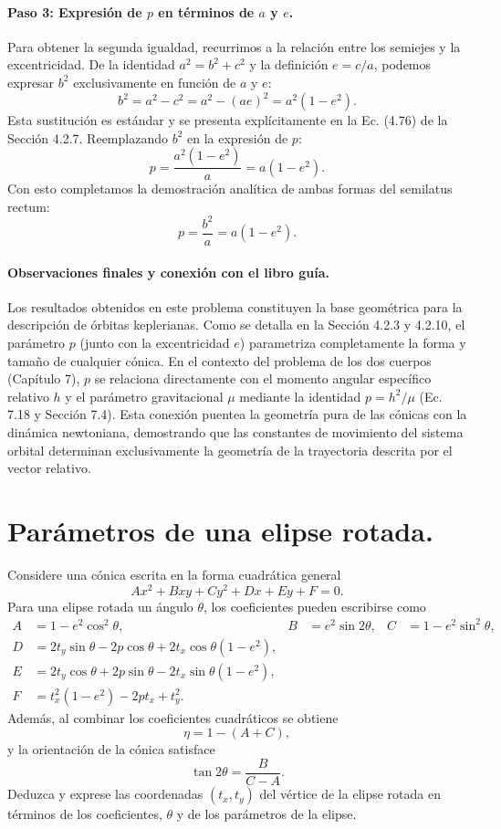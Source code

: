\documentclass[12pt, a4paper]{article}
\begin{document}
\paragraph{Paso 3: Expresión de $p$ en términos de $a$ y $e$.}
Para obtener la segunda igualdad, recurrimos a la relación entre los semiejes y la excentricidad. De la identidad $a^2 = b^2 + c^2$ y la definición $e = c/a$, podemos expresar $b^2$ exclusivamente en función de $a$ y $e$:
$$
b^2 = a^2 - c^2 = a^2 - (ae)^2 = a^2(1 - e^2).
$$
Esta sustitución es estándar y se presenta explícitamente en la Ec. (4.76) de la Sección 4.2.7. Reemplazando $b^2$ en la expresión de $p$:
$$
p = \frac{a^2(1 - e^2)}{a} = a(1 - e^2).
$$
Con esto completamos la demostración analítica de ambas formas del semilatus rectum:
$$
\boxed{p = \frac{b^2}{a} = a(1 - e^2)}.
$$

\paragraph{Observaciones finales y conexión con el libro guía.}
Los resultados obtenidos en este problema constituyen la base geométrica para la descripción de órbitas keplerianas. Como se detalla en la Sección 4.2.3 y 4.2.10, el parámetro $p$ (junto con la excentricidad $e$) parametriza completamente la forma y tamaño de cualquier cónica. En el contexto del problema de los dos cuerpos (Capítulo 7), $p$ se relaciona directamente con el momento angular específico relativo $h$ y el parámetro gravitacional $\mu$ mediante la identidad $p = h^2/\mu$ (Ec. 7.18 y Sección 7.4). Esta conexión puentea la geometría pura de las cónicas con la dinámica newtoniana, demostrando que las constantes de movimiento del sistema orbital determinan exclusivamente la geometría de la trayectoria descrita por el vector relativo.



\section{Parámetros de una elipse rotada.} Considere una cónica escrita en la forma cuadrática general
$$Ax^2 + Bxy + Cy^2 + Dx + Ey + F = 0.$$
Para una elipse rotada un ángulo $\theta$, los coeficientes pueden escribirse como
\begin{align*}
A &= 1 - e^2 \cos^2 \theta, & B &= e^2 \sin 2\theta, & C &= 1 - e^2 \sin^2 \theta, \\
D &= 2t_y \sin \theta - 2p \cos\theta + 2t_x \cos\theta(1 - e^2), \\
E &= 2t_y \cos\theta + 2p \sin\theta - 2t_x \sin \theta(1 - e^2), \\
F &= t_x^2(1 - e^2) - 2pt_x + t_y^2.
\end{align*}
Además, al combinar los coeficientes cuadráticos se obtiene
$$\eta = 1 - (A + C),$$
y la orientación de la cónica satisface
$$\tan 2\theta = \frac{B}{C - A}.$$
Deduzca y exprese las coordenadas $(t_x, t_y)$ del vértice de la elipse rotada en términos de los coeficientes, $\theta$ y de los parámetros de la elipse.
\end{document}
